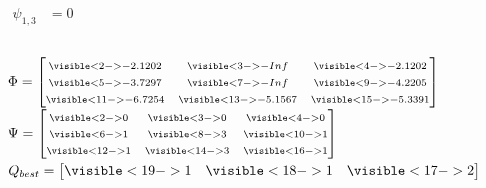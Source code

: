 \begin{frame}
\begin{columns}[T]
{    \vspace*{2em}
    \begin{equation*}
      \begin{split}
        \scriptstyle \psi_{1,3} & \scriptstyle  = 0
      \end{split}
    \end{equation*}
    }


  \end{columns}
  $\Phi=\begin{bmatrix}
       \scriptstyle \visible<2->{-2.1202} & \scriptstyle \visible<3->{-Inf} & \scriptstyle \visible<4->{-2.1202} \\
       \scriptstyle \visible<5->{-3.7297} & \scriptstyle \visible<7->{-Inf} & \scriptstyle \visible<9->{-4.2205} \\
       \scriptstyle \visible<11->{-6.7254} & \scriptstyle \visible<13->{-5.1567} & \scriptstyle \visible<15->{-5.3391}\end{bmatrix}$ $\Psi=\begin{bmatrix}
       \scriptstyle \visible<2->{0} & \scriptstyle \visible<3->{0} & \scriptstyle \visible<4->{0} \\
       \scriptstyle \visible<6->{1} & \scriptstyle \visible<8->{3} & \scriptstyle \visible<10->{1} \\
       \scriptstyle \visible<12->{1} & \scriptstyle \visible<14->{3} & \scriptstyle \visible<16->{1}\end{bmatrix}$ $Q_{best} = \begin{bmatrix}\visible<19->{1} & \visible<18->{1} & \visible<17->{2}\end{bmatrix}$
     
\end{frame}

